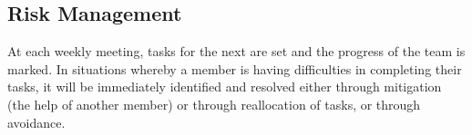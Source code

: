 \documentclass{article} \usepackage{graphicx}
\begin{document}
        \subsection{Risk Management} 		
            At each weekly meeting, tasks for the next are set and the progress of the team 
            is marked. In situations whereby a member is having difficulties in completing 
            their tasks, it will be immediately identified and resolved either through 
            mitigation (the help of another member) or through reallocation of tasks, 
            or through avoidance. 	
		        
        
\end{document}
